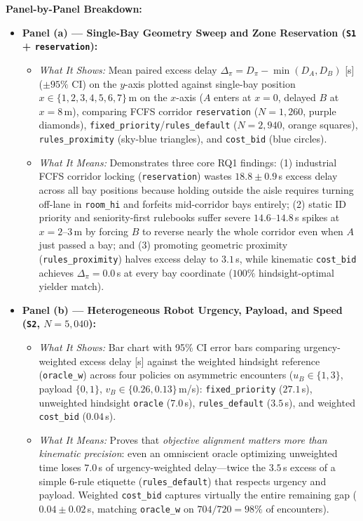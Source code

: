 \documentclass[10pt,a4paper]{article}
\begin{document}
{\small
\textbf{Panel-by-Panel Breakdown:}
\begin{itemize}
  \item \textbf{Panel (a) --- Single-Bay Geometry Sweep and Zone Reservation (\texttt{S1} + \texttt{reservation}):}
  \begin{itemize}
    \item \emph{What It Shows:} Mean paired excess delay $\Delta_\pi = D_\pi - \min(D_A,D_B)$ [s] ($\pm 95\%$ CI) on the $y$-axis plotted against single-bay position $x\in\{1,2,3,4,5,6,7\}$\,m on the $x$-axis ($A$ enters at $x=0$, delayed $B$ at $x=8$\,m), comparing FCFS corridor \texttt{reservation} ($N=1{,}260$, purple diamonds), \texttt{fixed\_priority}/\texttt{rules\_default} ($N=2{,}940$, orange squares), \texttt{rules\_proximity} (sky-blue triangles), and \texttt{cost\_bid} (blue circles).
    \item \emph{What It Means:} Demonstrates three core RQ1 findings: (1) industrial FCFS corridor locking (\texttt{reservation}) wastes $18.8\pm 0.9$\,s excess delay across all bay positions because holding outside the aisle requires turning off-lane in \texttt{room\_hi} and forfeits mid-corridor bays entirely; (2) static ID priority and seniority-first rulebooks suffer severe $14.6$--$14.8$\,s spikes at $x=2$--$3$\,m by forcing $B$ to reverse nearly the whole corridor even when $A$ just passed a bay; and (3) promoting geometric proximity (\texttt{rules\_proximity}) halves excess delay to $3.1$\,s, while kinematic \texttt{cost\_bid} achieves $\Delta_\pi = 0.0$\,s at every bay coordinate ($100\%$ hindsight-optimal yielder match).
  \end{itemize}
  \item \textbf{Panel (b) --- Heterogeneous Robot Urgency, Payload, and Speed (\texttt{S2}, $N=5{,}040$):}
  \begin{itemize}
    \item \emph{What It Shows:} Bar chart with 95\% CI error bars comparing urgency-weighted excess delay [s] against the weighted hindsight reference (\texttt{oracle\_w}) across four policies on asymmetric encounters ($u_B\in\{1,3\}$, payload $\{0,1\}$, $v_B\in\{0.26,0.13\}$\,m/s): \texttt{fixed\_priority} ($27.1$\,s), unweighted hindsight \texttt{oracle} ($7.0$\,s), \texttt{rules\_default} ($3.5$\,s), and weighted \texttt{cost\_bid} ($0.04$\,s).
    \item \emph{What It Means:} Proves that \emph{objective alignment matters more than kinematic precision}: even an omniscient oracle optimizing unweighted time loses $7.0$\,s of urgency-weighted delay---twice the $3.5$\,s excess of a simple 6-rule etiquette (\texttt{rules\_default}) that respects urgency and payload. Weighted \texttt{cost\_bid} captures virtually the entire remaining gap ($0.04\pm 0.02$\,s, matching \texttt{oracle\_w} on $704/720 = 98\%$ of encounters).

\end{itemize}
\end{itemize}}
\end{document}
